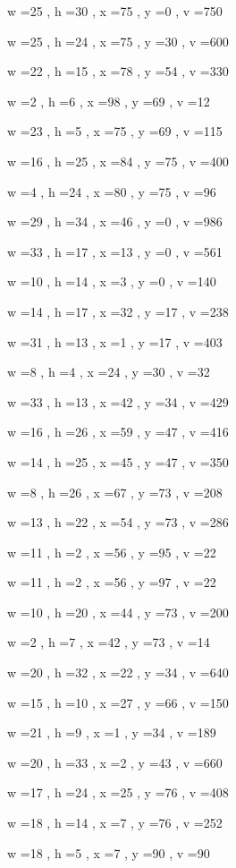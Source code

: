 \documentclass[11pt]{article}
\begin{document}
w =25 , h =30 , x =75 , y =0 , v =750
\par
w =25 , h =24 , x =75 , y =30 , v =600
\par
w =22 , h =15 , x =78 , y =54 , v =330
\par
w =2 , h =6 , x =98 , y =69 , v =12
\par
w =23 , h =5 , x =75 , y =69 , v =115
\par
w =16 , h =25 , x =84 , y =75 , v =400
\par
w =4 , h =24 , x =80 , y =75 , v =96
\par
w =29 , h =34 , x =46 , y =0 , v =986
\par
w =33 , h =17 , x =13 , y =0 , v =561
\par
w =10 , h =14 , x =3 , y =0 , v =140
\par
w =14 , h =17 , x =32 , y =17 , v =238
\par
w =31 , h =13 , x =1 , y =17 , v =403
\par
w =8 , h =4 , x =24 , y =30 , v =32
\par
w =33 , h =13 , x =42 , y =34 , v =429
\par
w =16 , h =26 , x =59 , y =47 , v =416
\par
w =14 , h =25 , x =45 , y =47 , v =350
\par
w =8 , h =26 , x =67 , y =73 , v =208
\par
w =13 , h =22 , x =54 , y =73 , v =286
\par
w =11 , h =2 , x =56 , y =95 , v =22
\par
w =11 , h =2 , x =56 , y =97 , v =22
\par
w =10 , h =20 , x =44 , y =73 , v =200
\par
w =2 , h =7 , x =42 , y =73 , v =14
\par
w =20 , h =32 , x =22 , y =34 , v =640
\par
w =15 , h =10 , x =27 , y =66 , v =150
\par
w =21 , h =9 , x =1 , y =34 , v =189
\par
w =20 , h =33 , x =2 , y =43 , v =660
\par
w =17 , h =24 , x =25 , y =76 , v =408
\par
w =18 , h =14 , x =7 , y =76 , v =252
\par
w =18 , h =5 , x =7 , y =90 , v =90
\par
\newpage
\end{document}
